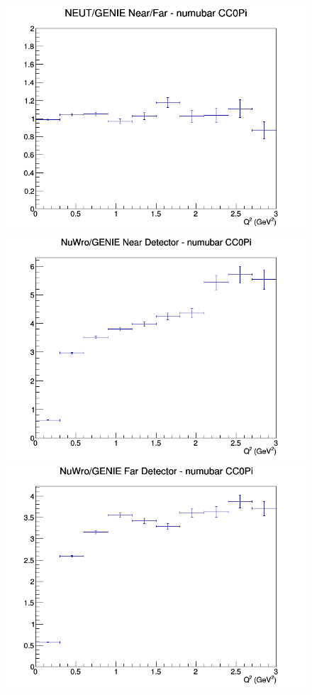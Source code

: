 \documentclass[12pt]{article}
\begin{document}
\begin{figure}[h]
\endminipage
{}
\includegraphics[width=\linewidth]{eff_Q2/FGT/ratios/CC0Pi_NEUT_GENIE_numubar_NF_Q2.png}
\endminipage
\newline
{}
\includegraphics[width=\linewidth]{eff_Q2/FGT/ratios/CC0Pi_NuWro_GENIE_numubar_near_Q2.png}
\endminipage
{}
\includegraphics[width=\linewidth]{eff_Q2/FGT/ratios/CC0Pi_NuWro_GENIE_numubar_far_Q2.png}

\end{figure}
\end{document}
